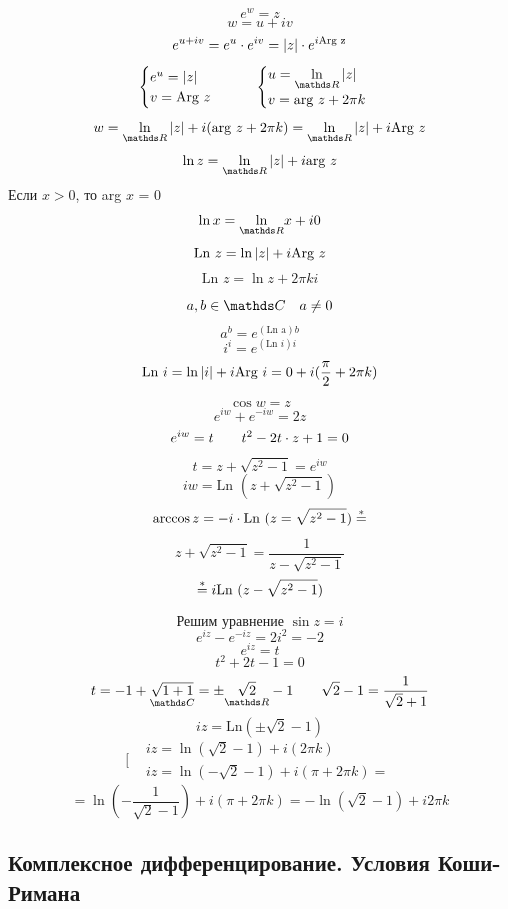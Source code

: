 \documentclass[main]{subfiles}
\begin{document}
	\begin{Definition} 
		\[e^w = z\]
		\[w = u + iv\]
		\[e^{u + iv} = e^u \cdot e^{iv} = \left|z\right| \cdot e^{i \text{Arg z}} \]
		\[\begin{cases}
				e^u = \abs{z} \\
				v = \text{Arg } z
			\end{cases} \qq \begin{cases}
				u = \us{\R}{\ln} \abs{z} \\
				v = \text{arg } z + 2 \pi k
			\end{cases}\]
		\[w = \us{\R}{\ln} \abs{z} + i (\text{arg } z + 2\pi k) = \us{\R}{\ln } \abs{z} + i \text{Arg } z\]
		\[\ln z = \us{\R}{\ln}\abs{z} + i \text{arg } z\]
		Если $x > 0$, то arg $x$ = 0
		\[\ln x = \us{\R}{\ln} x + i0\]
		\[\text{Ln } z = \ln \left|z\right| + i \text{Arg } z\]
		\[\text{Ln } z = \ln z + 2 \pi k i\]

		\[a, b \in \CC \q a \neq 0\]
		\[a^b = e ^ {(\text{Ln a})b}\]
		\[i^i = e^{(\text{Ln } i)i} \]
		\[\text{Ln } i = \ln \left|i\right| + i \text{Arg } i = 0 + i (\frac{\pi}{2} + 2 \pi k)\]
	\end{Definition}

	\begin{Definition} 
		\[\cos w = z\]
		\[e^{iw} + e^{-iw} = 2z\]
		\[e^{iw} = t \qquad t^2 - 2t \cdot z + 1 = 0\]
		\[t = z + \sqrt{z^2 - 1} = e^{iw} \]
		\[iw = \text{Ln } (z + \sqrt{z^2 - 1})\]
		\[\arccos z = -i \cdot\text{Ln } (z = \sqrt{z^2 - 1})  \overset{*}{=}\]
		\[z + \sqrt{z^2 - 1} = \frac{1}{z - \sqrt{z^2  - 1}}\]
		\[\overset{*}{=} i \text{Ln } (z - \sqrt{z^2 - 1})\]
	\end{Definition}

	\begin{Example}
		\[\text{Решим уравнение } \sin z = i\]
		\[e^{iz} - e^{-iz} = 2i^2 = -2  \]
		\[e^{iz}  = t\]
		\[t^2 + 2t - 1 = 0\]
		\[t = -1 + \us{\CC}{\sqrt{1 + 1}} = \pm \us{\R}{\sqrt{2}} - 1 \qq \sqrt{2} - 1 = \frac{1}{\sqrt{2} + 1}\]
		\[iz = \text{Ln} (\pm \sqrt{2} - 1)\]
		\[\bigg[\begin{align}
				 & iz = \ln(\sqrt{2} - 1) + i (2 \pi k)          \\
				 & iz = \ln(-\sqrt{2} - 1) + i (\pi + 2 \pi k) =
			\end{align}\]
		\[ = \ln(- \frac{1}{\sqrt{2} - 1}) + i (\pi + 2\pi k) = -\ln(\sqrt{2} - 1) + i 2 \pi k\]
	\end{Example}

	\newpage
	\subsection{Комплексное дифференцирование. Условия Коши-Римана}
	
\end{document}
